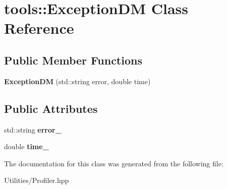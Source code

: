 \hypertarget{classtools_1_1_exception_d_m}{\section{tools\+:\+:Exception\+D\+M Class Reference}
\label{classtools_1_1_exception_d_m}
}
\subsection*{Public Member Functions}
\begin{DoxyCompactItemize}
\item 
\hypertarget{classtools_1_1_exception_d_m_a61e56416bea0dce491c0ed80d483519f}{{\bfseries Exception\+D\+M} (std\+::string error, double time)}\label{classtools_1_1_exception_d_m_a61e56416bea0dce491c0ed80d483519f}

\end{DoxyCompactItemize}
\subsection*{Public Attributes}
\begin{DoxyCompactItemize}
\item 
\hypertarget{classtools_1_1_exception_d_m_adb19a379fa7a2188be8646073683fd9d}{std\+::string {\bfseries error\+\_\+}}\label{classtools_1_1_exception_d_m_adb19a379fa7a2188be8646073683fd9d}

\item 
\hypertarget{classtools_1_1_exception_d_m_add1e7c6b8ec8cc5d7c395ebb3a3e0f90}{double {\bfseries time\+\_\+}}\label{classtools_1_1_exception_d_m_add1e7c6b8ec8cc5d7c395ebb3a3e0f90}

\end{DoxyCompactItemize}


The documentation for this class was generated from the following file\+:\begin{DoxyCompactItemize}
\item 
Utilities/Profiler.\+hpp\end{DoxyCompactItemize}
